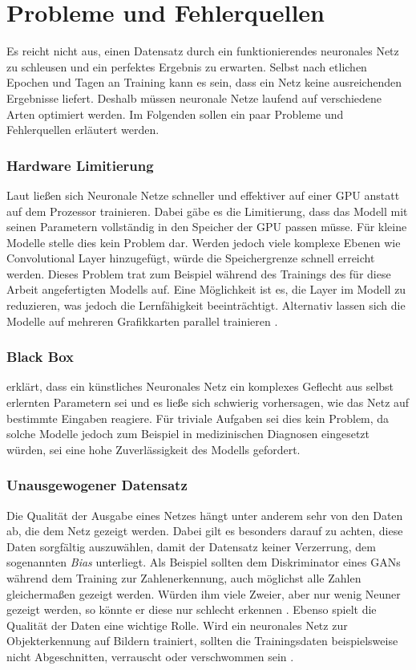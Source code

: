 \section{Probleme und Fehlerquellen}
Es reicht nicht aus, einen Datensatz durch ein funktionierendes neuronales Netz zu schleusen und ein perfektes Ergebnis zu erwarten. Selbst nach etlichen Epochen und Tagen an Training kann es sein, dass ein Netz keine ausreichenden Ergebnisse liefert. Deshalb müssen neuronale Netze laufend auf verschiedene Arten optimiert werden. Im Folgenden sollen ein paar Probleme und Fehlerquellen erläutert werden.\\

\subsubsection*{Hardware Limitierung}
Laut \citet[]{fevbre-no-date} ließen sich Neuronale Netze schneller und effektiver auf einer GPU anstatt auf dem Prozessor trainieren. Dabei gäbe es die Limitierung, dass das Modell mit seinen Parametern vollständig in den Speicher der GPU passen müsse. Für kleine Modelle stelle dies kein Problem dar. Werden jedoch viele komplexe Ebenen wie Convolutional Layer hinzugefügt, würde die Speichergrenze schnell erreicht werden. Dieses Problem trat zum Beispiel während des Trainings des für diese Arbeit angefertigten Modells auf. Eine Möglichkeit ist es, die Layer im Modell zu reduzieren, was jedoch die Lernfähigkeit beeinträchtigt. Alternativ lassen sich die Modelle auf mehreren Grafikkarten parallel trainieren \parencite[]{giacaglia-2021}.

\subsubsection*{Black Box}
\citet[]{dickson-2019} erklärt, dass ein künstliches Neuronales Netz ein komplexes Geflecht aus selbst erlernten Parametern sei und es ließe sich schwierig vorhersagen, wie das Netz auf bestimmte Eingaben reagiere. Für triviale Aufgaben sei dies kein Problem, da solche Modelle jedoch zum Beispiel in medizinischen Diagnosen eingesetzt würden, sei eine hohe Zuverlässigkeit des Modells gefordert.

\subsubsection*{Unausgewogener Datensatz}
Die Qualität der Ausgabe eines Netzes hängt unter anderem sehr von den Daten ab, die dem Netz gezeigt werden. Dabei gilt es besonders darauf zu achten, diese Daten sorgfältig auszuwählen, damit der Datensatz keiner Verzerrung, dem sogenannten \textit{Bias} unterliegt. Als Beispiel sollten dem Diskriminator eines GANs während dem Training zur Zahlenerkennung, auch möglichst alle Zahlen gleichermaßen gezeigt werden. Würden ihm viele Zweier, aber nur wenig Neuner gezeigt werden, so könnte er diese nur schlecht erkennen \parencite[]{hao-2020}. Ebenso spielt die Qualität der Daten eine wichtige Rolle. Wird ein neuronales Netz zur Objekterkennung auf Bildern trainiert, sollten die Trainingsdaten beispielsweise nicht Abgeschnitten, verrauscht oder verschwommen sein \parencite[]{prov-international-inc-2022}.

